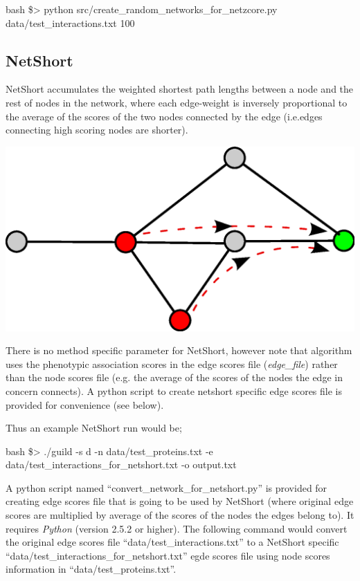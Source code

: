 \documentclass[11pt,twoside]{article}
\newcommand{\printcommand}[1]{\colorbox{code}{\scriptsize{\BUseVerbatim{#1}}}}
\begin{document}
\begin{SaveVerbatim}{bash}
\$> python src/create_random_networks_for_netzcore.py data/test_interactions.txt 100
\end{SaveVerbatim}
\printcommand{bash}

\subsection{NetShort}
NetShort accumulates the weighted shortest path lengths between a node and the 
rest of nodes in the network, where each edge-weight is inversely proportional 
to the average of the scores of the two nodes connected by the edge (i.e.edges 
connecting high scoring nodes are shorter). 

\includegraphics[scale=0.5]{netshort.eps}

\vspace{5 mm}
There is no method specific parameter for NetShort, however note that 
algorithm uses the phenotypic association scores in the edge scores file 
(\textit{edge\_file}) rather than the node scores file (e.g. the average of 
the scores of the nodes the edge in concern connects). A python script to 
create netshort specific edge scores file is provided for convenience (see
below).

\vspace{5 mm}
Thus an example NetShort run would be;

\begin{SaveVerbatim}{bash}
\$> ./guild -s d -n data/test_proteins.txt -e data/test_interactions_for_netshort.txt -o output.txt
\end{SaveVerbatim}
\printcommand{bash}

\vspace{5 mm}
A python script named ``convert\_network\_for\_netshort.py'' is provided 
for creating edge scores file that is going to be used by NetShort 
(where original edge scores are multiplied by average of the scores of the 
nodes the edges belong to). It requires \textit{Python} (version 2.5.2 or 
higher). The following command would convert the original edge scores file 
``data/test\_interactions.txt'' to a NetShort specific 
``data/test\_interactions\_for\_netshort.txt'' egde scores file using node
scores information in ``data/test\_proteins.txt''.
\end{document}

